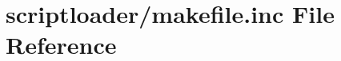 \hypertarget{scriptloader_2makefile_8inc}{\section{scriptloader/makefile.inc \-File \-Reference}
\label{scriptloader_2makefile_8inc}
}
